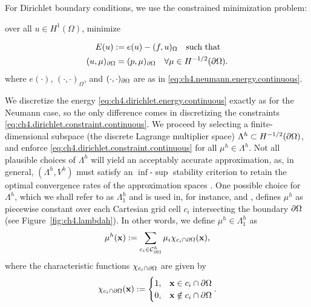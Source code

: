 For Dirichlet boundary conditions, we use the constrained minimization problem:
\begin{center}
over all $u \in H^1(\Omega)$, minimize
\end{center}
\begin{align}
E(u) := {} & e(u) - (f,u)_{\Omega} \label{eq:ch4.dirichlet.energy.continuous} \quad \text{such that}  \\
(u,\mu)_{\partial\Omega} = {} & (p,\mu)_{\partial\Omega} \quad \forall \mu \in H^{-1/2}(\partial\Omega). \label{eq:ch4.dirichlet.constraint.continuous}
\end{align}
where $e(\cdot)$, $(\cdot,\cdot)_{\Omega}$, and $(\cdot,\cdot)_{\partial\Omega}$ are as in \eqref{eq:ch4.neumann.energy.continuous}.

We discretize the energy \eqref{eq:ch4.dirichlet.energy.continuous} exactly as for the Neumann case, so the only difference comes in discretizing the constraints \eqref{eq:ch4.dirichlet.constraint.continuous}. We proceed by selecting a finite-dimensional subspace (the discrete Lagrange multiplier space) $\Lambda^h \subset H^{-1/2}(\partial\Omega)$, and enforce \eqref{eq:ch4.dirichlet.constraint.continuous} for all $\mu^h \in \Lambda^h$. Not all plausible choices of $\Lambda^h$ will yield an acceptably accurate approximation, as, in general, $(\Lambda^h, V^h)$ must satisfy an $\inf$-$\sup$ stability criterion to retain the optimal convergence rates of the approximation spaces \cite{Pitkaranta79}. One possible choice for $\Lambda^h$, which we shall refer to as $\Lambda^h_1$ and is used in, for instance, \cite{Vaughan06} and \cite{Mourad07}, defines $\mu^h$ as piecewise constant over each Cartesian grid cell $c_i$ intersecting the boundary $\partial\Omega$ (see Figure~\ref{fig:ch4.lambdah}). In other words, we define $\mu^h \in \Lambda^h_1$ as
\begin{equation*}
\mu^h(\mathbf{x}) := \sum_{c_i \in \mathcal{C}^h_{\partial\Omega}} \mu_i \chi_{c_i \cap \partial\Omega}(\mathbf{x}),
\end{equation*}
where the characteristic functions $\chi_{c_i \cap \partial\Omega}$ are given by
\begin{equation} \label{eq:ch4.lambdah1.basis}
\chi_{c_i \cap \partial\Omega}(\mathbf{x}) := \begin{cases} 1, & \mathbf{x} \in c_i \cap \partial\Omega \\ 0, & \mathbf{x} \notin c_i \cap \partial\Omega \end{cases}.
\end{equation}


